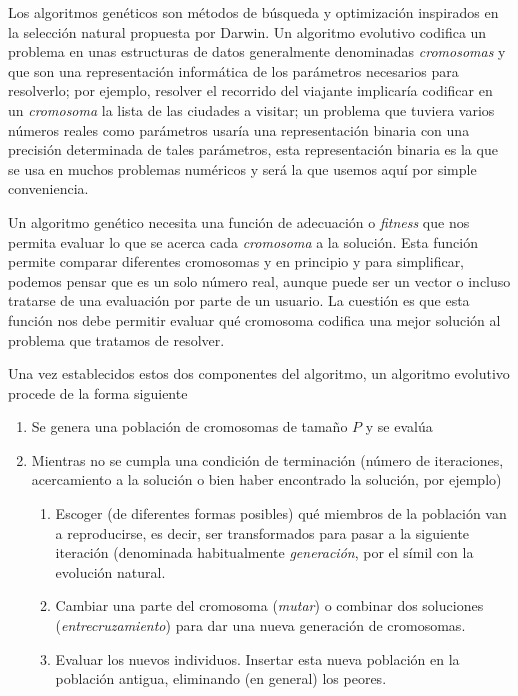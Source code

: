 \documentclass{article}
\begin{document}
Los algoritmos genéticos \cite{guervos2010informatica} son métodos de búsqueda y optimización
inspirados en la selección natural propuesta por
Darwin. Un algoritmo evolutivo codifica un problema en unas
estructuras de datos generalmente denominadas {\em cromosomas} y que
son una representación informática de los parámetros necesarios para
resolverlo; por ejemplo, resolver el recorrido del viajante implicaría
codificar en un {\em cromosoma} la lista de las ciudades a visitar; un
problema que tuviera varios números reales como parámetros usaría una
representación binaria con una precisión determinada de tales
parámetros, esta representación binaria es la que se usa en muchos
problemas numéricos y será la que usemos aquí por simple
conveniencia. 

Un algoritmo genético necesita una función de adecuación o {\em
  fitness} que nos permita evaluar lo que se acerca cada {\em
  cromosoma} a la solución. Esta función permite comparar diferentes
cromosomas y en principio y para simplificar, podemos pensar que es un
solo número real, aunque puede ser un vector o incluso tratarse de una
evaluación por parte de un usuario. La cuestión es que esta función
nos debe permitir evaluar qué cromosoma codifica una mejor solución al
problema que tratamos de resolver.

Una vez establecidos estos dos componentes del algoritmo, un algoritmo
evolutivo procede de la forma siguiente\begin{enumerate}
\item Se genera una población de cromosomas de tamaño $P$ y se evalúa
\item Mientras no se cumpla una condición de terminación (número de
  iteraciones, acercamiento a la solución o bien haber encontrado la
  solución, por ejemplo)\begin{enumerate}
  \item Escoger (de diferentes formas posibles) qué miembros de la
    población van a reproducirse, es decir, ser transformados para
    pasar a la siguiente iteración (denominada habitualmente {\em
      generación}, por el símil con la evolución natural.
  \item Cambiar una parte del cromosoma ({\em mutar}) o combinar dos
    soluciones ({\em entrecruzamiento}) para dar una nueva generación
    de cromosomas.
  \item Evaluar los nuevos individuos. Insertar esta nueva población
    en la población antigua, eliminando (en general) los peores. 
  \end{enumerate}
\end{enumerate}
\end{document}
